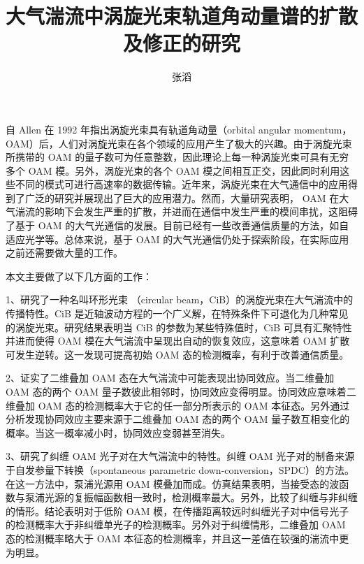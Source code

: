 \documentclass[master]{thesis-uestc}
\title{大气湍流中涡旋光束轨道角动量谱的扩散及修正的研究}
\author{张滔}
\begin{document}
\begin{chineseabstract}
自 Allen 在 1992 年指出涡旋光束具有轨道角动量（orbital angular
momentum，OAM）后，人们对涡旋光束在各个领域的应用产生了极大的兴趣。由于涡旋光束所携带的 OAM 的量子数可为任意整数，因此理论上每一种涡旋光束可具有无穷多个 OAM 模。另外，涡旋光束的各个 OAM 模之间相互正交，因此同时利用这些不同的模式可进行高速率的数据传输。近年来，涡旋光束在大气通信中的应用得到了广泛的研究并展现出了巨大的应用潜力。然而，大量研究表明， OAM 在大气湍流的影响下会发生严重的扩散，并进而在通信中发生严重的模间串扰，这阻碍了基于 OAM 的大气光通信的发展。目前已经有一些改善通信质量的方法，如自适应光学等。总体来说，基于 OAM 的大气光通信仍处于探索阶段，在实际应用之前还需要做大量的工作。

本文主要做了以下几方面的工作：

1、研究了一种名叫环形光束 （circular beam，CiB）的涡旋光束在大气湍流中的传播特性。CiB 是近轴波动方程的一个广义解，在特殊条件下可退化为几种常见的涡旋光束。研究结果表明当 CiB 的参数为某些特殊值时，CiB 可具有汇聚特性并进而使得 OAM 模在大气湍流中呈现出自动的恢复效应，这意味着 OAM 扩散可发生逆转。这一发现可提高初始 OAM 态的检测概率，有利于改善通信质量。

2、证实了二维叠加 OAM 态在大气湍流中可能表现出协同效应。当二维叠加 OAM 态的两个 OAM 量子数彼此相邻时，协同效应变得明显。协同效应意味着二维叠加 OAM 态的检测概率大于它的任一部分所表示的 OAM 本征态。另外通过分析发现协同效应主要来源于二维叠加 OAM 态的两个 OAM 量子数互相变化的概率。当这一概率减小时，协同效应变弱甚至消失。

3、研究了纠缠 OAM 光子对在大气湍流中的特性。纠缠 OAM 光子对的制备来源于自发参量下转换（spontaneous parametric down-conversion，SPDC）的方法。在这一方法中，泵浦光源用 OAM 模叠加而成。仿真结果表明，当接受态的波函数与泵浦光源的复振幅函数相一致时，检测概率最大。另外，比较了纠缠与非纠缠的情形。结论表明对于低阶 OAM 模，在传播距离较远时纠缠光子对中信号光子的检测概率大于非纠缠单光子的检测概率。另外对于纠缠情形，二维叠加 OAM 态的检测概率略大于 OAM 本征态的检测概率，并且这一差值在较强的湍流中更为明显。
\end{chineseabstract}
\end{document}
